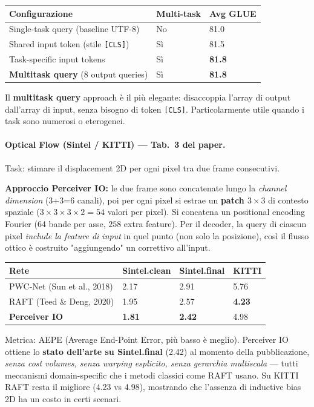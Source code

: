 \documentclass[
  11pt,
]{article}
\begin{document}
{\small
\begin{longtable}{@{}p{5.5cm} p{3cm} p{3cm}@{}}
\toprule
\textbf{Configurazione} & \textbf{Multi-task} & \textbf{Avg GLUE} \\
\midrule
\endhead
Single-task query (baseline UTF-8) & No & 81.0 \\[2pt]
Shared input token (stile \texttt{[CLS]}) & Sì & 81.5 \\[2pt]
Task-specific input tokens & Sì & \textbf{81.8} \\[2pt]
\textbf{Multitask query} (8 output queries) & Sì & \textbf{81.8} \\
\bottomrule
\end{longtable}
}

Il \textbf{multitask query} approach è il più elegante: disaccoppia l'array di output dall'array di input, senza bisogno di token \texttt{[CLS]}. Particolarmente utile quando i task sono numerosi o eterogenei.

\paragraph{Optical Flow (Sintel / KITTI) --- Tab.\ 3 del paper.} Task: stimare il displacement 2D per ogni pixel tra due frame consecutivi.

\textbf{Approccio Perceiver IO:} le due frame sono concatenate lungo la \emph{channel dimension} (3+3=6 canali), poi per ogni pixel si estrae un \textbf{patch $3\times 3$} di contesto spaziale ($3 \times 3 \times 3 \times 2 = 54$ valori per pixel). Si concatena un positional encoding Fourier (64 bande per asse, $258$ extra feature). Per il decoder, la query di ciascun pixel \emph{include la feature di input} in quel punto (non solo la posizione), così il flusso ottico è costruito "aggiungendo" un correttivo all'input.

{\small
\begin{longtable}{@{}p{3.8cm} p{2.8cm} p{2.8cm} p{2.5cm}@{}}
\toprule
\textbf{Rete} & \textbf{Sintel.clean} & \textbf{Sintel.final} & \textbf{KITTI} \\
\midrule
\endhead
PWC-Net (Sun et al., 2018) & 2.17 & 2.91 & 5.76 \\[2pt]
RAFT (Teed \& Deng, 2020) & 1.95 & 2.57 & \textbf{4.23} \\[2pt]
\textbf{Perceiver IO} & \textbf{1.81} & \textbf{2.42} & 4.98 \\
\bottomrule
\end{longtable}
}

Metrica: AEPE (Average End-Point Error, più basso è meglio). Perceiver IO ottiene lo \textbf{stato dell'arte su Sintel.final} (2.42) al momento della pubblicazione, \emph{senza cost volumes, senza warping esplicito, senza gerarchia multiscala} --- tutti meccanismi domain-specific che i metodi classici come RAFT usano. Su KITTI RAFT resta il migliore (4.23 vs 4.98), mostrando che l'assenza di inductive bias 2D ha un costo in certi scenari.
\end{document}
